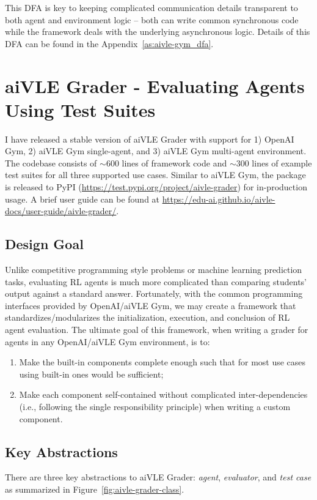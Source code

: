 This DFA is key to keeping complicated communication details transparent to both agent and environment logic – both can write common synchronous code while the framework deals with the underlying asynchronous logic. Details of this DFA can be found in the Appendix~\ref{as:aivle-gym_dfa}.

\section{aiVLE Grader - Evaluating Agents Using Test Suites}
\label{ch:aivle-grader}
I have released a stable version of aiVLE Grader with support for 1) OpenAI Gym, 2) aiVLE Gym single-agent, and 3) aiVLE Gym multi-agent environment. The codebase consists of $\sim$600 lines of framework code and $\sim$300 lines of example test suites for all three supported use cases. Similar to aiVLE Gym, the package is released to PyPI  (\href{https://test.pypi.org/project/aivle-grader/}{https://test.pypi.org/project/aivle-grader}) for in-production usage. A brief user guide can be found at \href{https://edu-ai.github.io/aivle-docs/user-guide/aivle-grader/}{https://edu-ai.github.io/aivle-docs/user-guide/aivle-grader/}.

\subsection{Design Goal}
Unlike competitive programming style problems or machine learning prediction tasks, evaluating RL agents is much more complicated than comparing students’ output against a standard answer. Fortunately, with the common programming interfaces provided by OpenAI/aiVLE Gym, we may create a framework that standardizes/modularizes the initialization, execution, and conclusion of RL agent evaluation. The ultimate goal of this framework, when writing a grader for agents in any OpenAI/aiVLE Gym environment, is to:
\begin{enumerate}
    \item Make the built-in components complete enough such that for most use cases using built-in ones would be sufficient;
    \item Make each component self-contained without complicated inter-dependencies (i.e., following the single responsibility principle) when writing a custom component.
\end{enumerate}

\subsection{Key Abstractions}
There are three key abstractions to aiVLE Grader: \textit{agent}, \textit{evaluator}, and \textit{test case} as summarized in Figure~\ref{fig:aivle-grader-class}.

